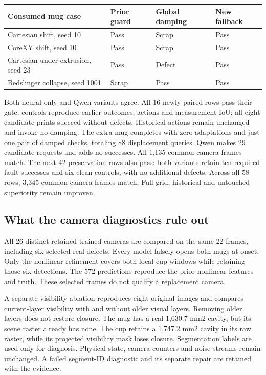 \documentclass[10pt,letterpaper]{article}
\begin{document}
\begin{center}
\begin{tabular}{@{}llll@{}}
\toprule
Consumed mug case & Prior guard & Global damping & New fallback \\
\midrule
Cartesian shift, seed 10 & Pass & Scrap & Pass \\
CoreXY shift, seed 10 & Pass & Scrap & Pass \\
Cartesian under-extrusion, seed 23 & Pass & Defect & Pass \\
Bedslinger collapse, seed 1001 & Scrap & Pass & Pass \\
\bottomrule
\end{tabular}
\end{center}
Both neural-only and Qwen variants agree. All 16 newly paired rows pass their
gate: controls reproduce earlier outcomes, actions and measurement IoU; all eight
candidate prints succeed without defects. Historical actions remain unchanged
and invoke no damping. The extra mug completes with zero adaptations and just
one pair of damped checks, totaling 88 displacement queries. Qwen makes 29
candidate requests and adds no successes. All 1,135 common camera frames match.
The next 42 preservation rows also pass: both variants retain ten required fault
successes and six clean controls, with no additional defects. Across all 58 rows,
3,345 common camera frames match. Full-grid, historical and untouched superiority
remain unproven.

\subsection*{What the camera diagnostics rule out}
All 26 distinct retained trained cameras are compared on the same 22 frames,
including six selected real defects. Every model falsely opens both mugs at
onset. Only the nonlinear refinement covers both local cup windows while retaining
those six detections. The 572 predictions reproduce the prior nonlinear features
and truth. These selected frames do not qualify a replacement camera.

A separate visibility ablation reproduces eight original images and compares
current-layer visibility with and without older visual layers. Removing older
layers does not restore closure. The mug has a real 1,630.7 mm2 cavity, but its
scene raster already has none. The cup retains a 1,747.2 mm2 cavity in its raw
raster, while its projected visibility mask loses closure. Segmentation labels
are used only for diagnosis. Physical state, camera counters and noise streams
remain unchanged. A failed segment-ID diagnostic and its separate repair are
retained with the evidence.
\end{document}

